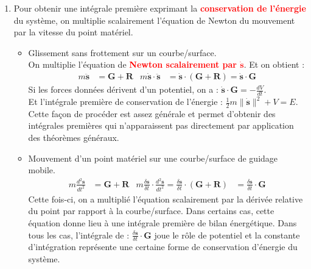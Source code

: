 \documentclass[a4paper]{article}
\begin{document}
\begin{enumerate}





\item Pour obtenir une intégrale première exprimant la \textcolor{red}{\textbf{conservation de l'énergie}} du système, on multiplie scalairement l'équation de Newton du mouvement par la vitesse du point matériel.

\begin{itemize}
    \item Glissement sans frottement sur un courbe/surface. \\
    On multiplie l'équation de \textcolor{red}{\textbf{Newton scalairement par $ \dot{\textbf{s}} $}}. Et on obtient : 
    \begin{align*} m \ddot{\textbf{s}} &= \textbf{G} + \textbf{R} &m \dot{\textbf{s}} \cdot \ddot{\textbf{s}} &= \dot{\textbf{s}} \cdot (\textbf{G} + \textbf{R}) = \dot{\textbf{s}} \cdot \textbf{G} \end{align*}
    Si les forces données dérivent d'un potentiel, on a : $\displaystyle \dot{\textbf{s}} \cdot \textbf{G} = - \frac{d V}{d t} $. \\
    Et l'intégrale première de conservation de l'énergie : $\displaystyle \frac{1}{2} m \| \dot{\textbf{s}} \|^2 + V = E $. \\
    Cette façon de procéder est assez générale et permet d'obtenir des intégrales premières qui n'apparaissent pas directement par application des théorèmes généraux.

    \item Mouvement d'un point matériel sur une courbe/surface de guidage mobile.
    \begin{align*} m \frac{d^2 \textbf{s}}{d t^2} &= \textbf{G} + \textbf{R} &m \frac{\delta \textbf{s}}{\delta t} \cdot \frac{d^2 \textbf{s}}{d t^2} = \frac{\delta \textbf{s}}{\delta t} \cdot (\textbf{G} + \textbf{R}) &= \frac{\delta \textbf{s}}{\delta t} \cdot \textbf{G} \end{align*}
    Cette fois-ci, on a multiplié l'équation scalairement par la dérivée relative du point par rapport à la courbe/surface. Dans certains cas, cette équation donne lieu à une intégrale première de bilan énergétique. Dans tous les cas, l'intégrale de : $\displaystyle \frac{\delta \textbf{s}}{\delta t} \cdot \textbf{G} $ joue le rôle de potentiel et la constante d'intégration représente une certaine forme de conservation d'énergie du système.
\end{itemize}






\end{enumerate}
\end{document}
